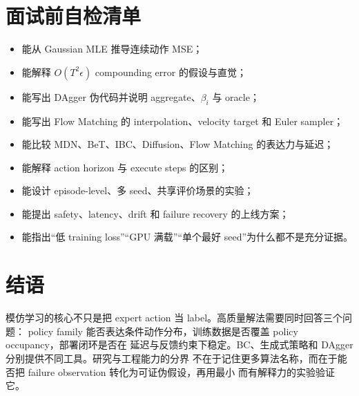 \documentclass[10pt,twocolumn,a4paper]{ctexart}
\begin{document}
\section{面试前自检清单}
\begin{itemize}
  \item 能从 Gaussian MLE 推导连续动作 MSE；
  \item 能解释 $O(T^2\epsilon)$ compounding error 的假设与直觉；
  \item 能写出 DAgger 伪代码并说明 aggregate、$\beta_i$ 与 oracle；
  \item 能写出 Flow Matching 的 interpolation、velocity target 和 Euler sampler；
  \item 能比较 MDN、BeT、IBC、Diffusion、Flow Matching 的表达力与延迟；
  \item 能解释 action horizon 与 execute steps 的区别；
  \item 能设计 episode-level、多 seed、共享评价场景的实验；
  \item 能提出 safety、latency、drift 和 failure recovery 的上线方案；
  \item 能指出“低 training loss”“GPU 满载”“单个最好 seed”为什么都不是充分证据。
\end{itemize}

\section{结语}
模仿学习的核心不只是把 expert action 当 label。高质量解法需要同时回答三个问题：
policy family 能否表达条件动作分布，训练数据是否覆盖 policy occupancy，部署闭环是否在
延迟与反馈约束下稳定。BC、生成式策略和 DAgger 分别提供不同工具。研究与工程能力的分界
不在于记住更多算法名称，而在于能否把 failure observation 转化为可证伪假设，再用最小
而有解释力的实验验证它。



\end{document}
